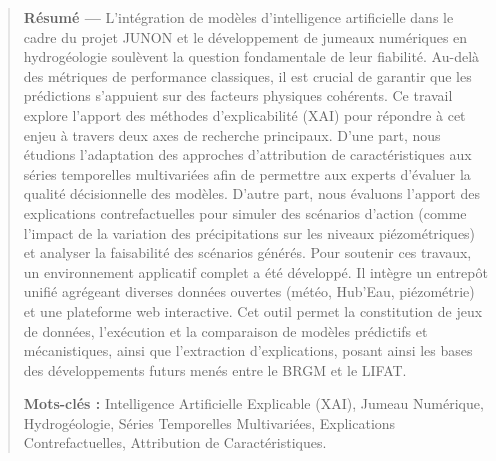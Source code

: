 \begin{abstract}
\noindent
\textbf{Résumé ---} L'intégration de modèles d'intelligence artificielle dans le cadre du projet JUNON et le développement de jumeaux numériques en hydrogéologie soulèvent la question fondamentale de leur fiabilité. Au-delà des métriques de performance classiques, il est crucial de garantir que les prédictions s'appuient sur des facteurs physiques cohérents. Ce travail explore l'apport des méthodes d'explicabilité (XAI) pour répondre à cet enjeu à travers deux axes de recherche principaux.
D'une part, nous étudions l'adaptation des approches d'attribution de caractéristiques aux séries temporelles multivariées afin de permettre aux experts d'évaluer la qualité décisionnelle des modèles. D'autre part, nous évaluons l'apport des explications contrefactuelles pour simuler des scénarios d'action (comme l'impact de la variation des précipitations sur les niveaux piézométriques) et analyser la faisabilité des scénarios générés.
Pour soutenir ces travaux, un environnement applicatif complet a été développé. Il intègre un entrepôt unifié agrégeant diverses données ouvertes (météo, Hub'Eau, piézométrie) et une plateforme web interactive. Cet outil permet la constitution de jeux de données, l'exécution et la comparaison de modèles prédictifs et mécanistiques, ainsi que l'extraction d'explications, posant ainsi les bases des développements futurs menés entre le BRGM et le LIFAT.

\vspace{0.5cm}
\noindent \textbf{Mots-clés :} Intelligence Artificielle Explicable (XAI), Jumeau Numérique, Hydrogéologie, Séries Temporelles Multivariées, Explications Contrefactuelles, Attribution de Caractéristiques.
\end{abstract}
